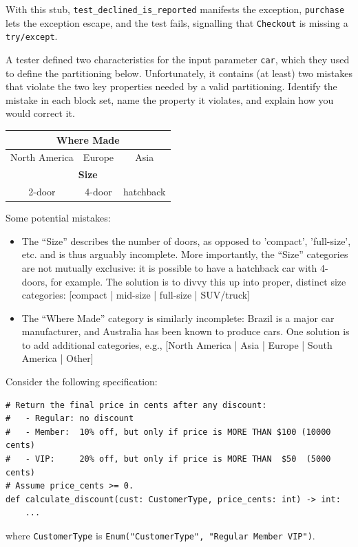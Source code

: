 \documentclass[addpoints, answers]{exam}
\newcommand{\Code}[1]{\texttt{#1}}
\begin{document}
\begin{questions}
\begin{parts}
\begin{solutionorbox}[6in]
  With this stub, \Code{test_declined_is_reported}
  manifests the exception, \Code{purchase} lets the
  exception escape, and the test fails, signalling that
  \Code{Checkout} is missing a
  \Code{try/except}.
\end{solutionorbox}

\end{parts}

\newpage

\question[5] A tester defined two characteristics for the input
  parameter \texttt{car}, which they used to define the partitioning
  below. Unfortunately, it contains (at least) two mistakes that
  violate the two key properties needed by a valid
  partitioning. Identify the mistake in each block set, name the
  property it violates, and explain how you would correct it.
  \begin{center}
  \begin{tabular}{|c|c|c|}
    \hline
    \multicolumn{3}{|c|}{\textbf{Where Made}} \\\hline
    North America & Europe & Asia \\\hline
    \multicolumn{3}{|c|}{\textbf{Size}}\\\hline
    2-door & 4-door & hatchback\\\hline
  \end{tabular}
\end{center}
\begin{solutionorbox}[4in] %
  Some potential mistakes:
  \begin{itemize}
  \item The ``Size'' describes the number of doors, as opposed to
    'compact', 'full-size', etc. and is thus arguably incomplete. More
    importantly, the ``Size'' categories are not mutually exclusive:
    it is possible to have a hatchback car with 4-doors, for
    example. The solution is to divvy this up into proper, distinct
    size categories: [compact | mid-size | full-size | SUV/truck]
  \item The ``Where Made'' category is similarly incomplete: Brazil is
    a major car manufacturer, and Australia has been known to produce
    cars. One solution is to add additional categories, e.g.,
    [North America | Asia | Europe | South America | Other]
  \end{itemize}
\end{solutionorbox}

\ifprintanswers \vfill \else \newpage \fi

\question
  Consider the following specification:
  \begin{verbatim}
# Return the final price in cents after any discount:
#   - Regular: no discount
#   - Member:  10% off, but only if price is MORE THAN $100 (10000 cents)
#   - VIP:     20% off, but only if price is MORE THAN  $50  (5000 cents)
# Assume price_cents >= 0.
def calculate_discount(cust: CustomerType, price_cents: int) -> int:
    ...
  \end{verbatim}
  where \Code{CustomerType} is
  \Code{Enum("CustomerType", "Regular Member VIP")}.
\begin{parts}

\end{parts}
\end{questions}
\end{document}
